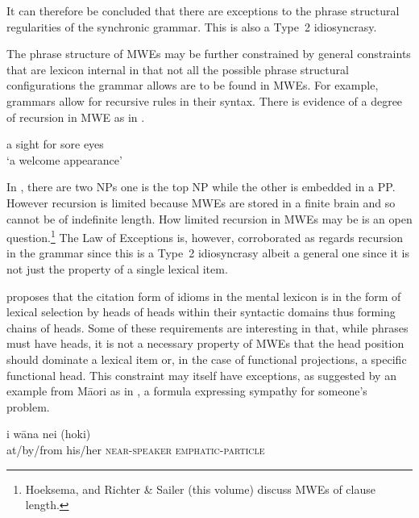 \documentclass[output=paper]{langsci/langscibook}
\begin{document}
\noindent
 It can therefore be concluded that there are exceptions to the phrase structural regularities of the synchronic grammar. This is also a Type~2 idiosyncrasy. 

The phrase structure of MWEs may be further constrained by general constraints that are lexicon internal in that not all the possible phrase structural configurations the grammar allows are to be found in MWEs. For example, grammars allow for recursive rules in their syntax. There is evidence of a degree of recursion in MWE as in .

\begin{exe}
\ex\label{ex:ex28} a sight for sore eyes\\
‘a welcome appearance’ 
\end{exe}



In , there are two NPs one is the top NP while the other is embedded in a PP. However recursion is limited because MWEs are stored in a finite brain and so cannot be of indefinite length. How limited recursion in MWEs may be is an open question.\footnote{   Hoeksema, and Richter \& Sailer (this volume) discuss MWEs of clause length.} The Law of Exceptions is, however, corroborated as regards recursion in the grammar since this is a Type~2 idiosyncrasy albeit a general one since it is not just the property of a single lexical item.

\citet{OGrady:98} proposes that the citation form of idioms in the mental lexicon is in the form of lexical selection by heads of heads within their syntactic domains thus forming chains of heads. Some of these requirements are interesting in that, while phrases must have heads, it is not a necessary property of MWEs that the head position should dominate a lexical item or, in the case of functional projections, a specific functional head. This constraint may itself have exceptions, as suggested by an example from M\=aori as in , 
a formula expressing sympathy for someone's problem.

\begin{exe}
\ex\label{ex:ex29} 
\gll i     w\=ana       nei         (hoki)\\
  at/by/from   his/her     \textsc{near-speaker} \textsc{emphatic-particle}\\
\end{exe}
\end{document}
